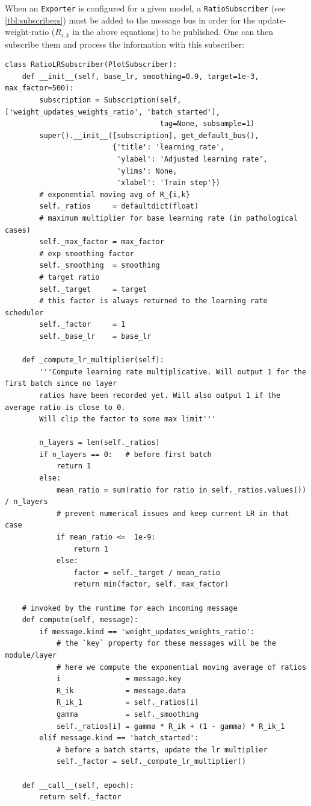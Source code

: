 When an \verb+Exporter+ is configured for a given model, a
\verb+RatioSubscriber+ (see \cref{tbl:subscribers}) must be added to the message
bus in order for the update-weight-ratio ($R_{i,k}$ in the above equations) to be
published. One can then subscribe them and process the information with this
subscriber:
\begin{lstlisting}
class RatioLRSubscriber(PlotSubscriber):
    def __init__(self, base_lr, smoothing=0.9, target=1e-3, max_factor=500):
        subscription = Subscription(self, ['weight_updates_weights_ratio', 'batch_started'],
                                    tag=None, subsample=1)
        super().__init__([subscription], get_default_bus(),
                         {'title': 'learning_rate',
                          'ylabel': 'Adjusted learning rate',
                          'ylims': None,
                          'xlabel': 'Train step'})
        # exponential moving avg of R_{i,k}
        self._ratios     = defaultdict(float)
        # maximum multiplier for base learning rate (in pathological cases)
        self._max_factor = max_factor
        # exp smoothing factor
        self._smoothing  = smoothing
        # target ratio
        self._target     = target
        # this factor is always returned to the learning rate scheduler
        self._factor     = 1
        self._base_lr    = base_lr

    def _compute_lr_multiplier(self):
        '''Compute learning rate multiplicative. Will output 1 for the first batch since no layer
        ratios have been recorded yet. Will also output 1 if the average ratio is close to 0.
        Will clip the factor to some max limit'''

        n_layers = len(self._ratios)
        if n_layers == 0:   # before first batch
            return 1
        else:
            mean_ratio = sum(ratio for ratio in self._ratios.values()) / n_layers
            # prevent numerical issues and keep current LR in that case
            if mean_ratio <=  1e-9:
                return 1
            else:
                factor = self._target / mean_ratio
                return min(factor, self._max_factor)

    # invoked by the runtime for each incoming message
    def compute(self, message):
        if message.kind == 'weight_updates_weights_ratio':
            # the `key` property for these messages will be the module/layer
            # here we compute the exponential moving average of ratios
            i               = message.key
            R_ik            = message.data
            R_ik_1          = self._ratios[i]
            gamma           = self._smoothing
            self._ratios[i] = gamma * R_ik + (1 - gamma) * R_ik_1
        elif message.kind == 'batch_started':
            # before a batch starts, update the lr multiplier
            self._factor = self._compute_lr_multiplier()

    def __call__(self, epoch):
        return self._factor
\end{lstlisting}

